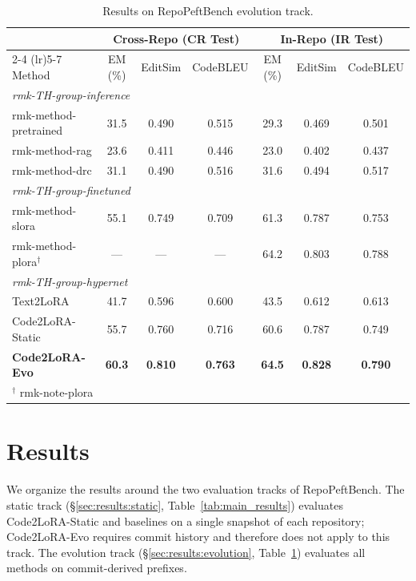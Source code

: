 \documentclass{llmxive}
\providecommand{\UseMacro}[1]{\csname rmk-#1\endcsname}
\providecommand{\codelora}{Code2LoRA\xspace}
\providecommand{\repopeftbench}{RepoPeftBench\xspace}
\providecommand{\codelorastatic}{\codelora-Static\xspace}
\providecommand{\codeloraevo}{\codelora-Evo\xspace}
\providecommand{\textlora}{Text2LoRA\xspace}
\begin{document}
\begin{table}[t]
\begin{small}
\begin{center}
\begin{tabular}{l@{\hskip 8pt}ccc@{\hskip 12pt}ccc}
\toprule
& \multicolumn{3}{c}{\textbf{Cross-Repo (CR Test)}} & \multicolumn{3}{c}{\textbf{In-Repo (IR Test)}} \\
\cmidrule(lr){2-4} \cmidrule(lr){5-7}
Method & EM (\%) & EditSim & CodeBLEU & EM (\%) & EditSim & CodeBLEU \\
\midrule
\multicolumn{7}{l}{\emph{\UseMacro{TH-group-inference}}} \\
\midrule
\UseMacro{method-pretrained} & 31.5 & 0.490 & 0.515 & 29.3 & 0.469 & 0.501 \\
\UseMacro{method-rag} & 23.6 & 0.411 & 0.446 & 23.0 & 0.402 & 0.437 \\
\UseMacro{method-drc} & 31.1 & 0.490 & 0.516 & 31.6 & 0.494 & 0.517 \\
\midrule
\multicolumn{7}{l}{\emph{\UseMacro{TH-group-finetuned}}} \\
\midrule
\UseMacro{method-slora} & 55.1 & 0.749 & 0.709 & 61.3 & 0.787 & 0.753 \\
\UseMacro{method-plora}$^\dag$ & --- & --- & --- & 64.2 & 0.803 & 0.788 \\
\midrule
\multicolumn{7}{l}{\emph{\UseMacro{TH-group-hypernet}}} \\
\midrule
\textlora{} & 41.7 & 0.596 & 0.600 & 43.5 & 0.612 & 0.613 \\
\codelorastatic{} & 55.7 & 0.760 & 0.716 & 60.6 & 0.787 & 0.749 \\
\textbf{\codeloraevo{}} & \textbf{60.3} & \textbf{0.810} & \textbf{0.763} & \textbf{64.5} & \textbf{0.828} & \textbf{0.790} \\
\bottomrule
\multicolumn{7}{l}{\footnotesize $^\dag$ \UseMacro{note-plora}} \\
\end{tabular}


\end{center}
\end{small}
\caption{Results on \repopeftbench{} evolution track.}
\label{tab:per_commit_results}
\end{table}

\section{Results}
\label{sec:results}

We organize the results around the two evaluation tracks of \repopeftbench{}.
The static track (\S\ref{sec:results:static}, Table~\ref{tab:main_results}) evaluates \codelorastatic{} and baselines on a single snapshot of each repository; \codeloraevo{} requires commit history and therefore does not apply to this track.
The evolution track (\S\ref{sec:results:evolution}, Table~\ref{tab:per_commit_results}) evaluates all methods on commit-derived prefixes.
\end{document}
